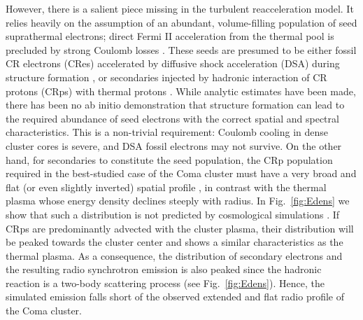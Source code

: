 \documentclass[a4paper,fleqn,usenatbib]{mnras}
\begin{document}
However, there is a salient piece missing in the turbulent
reacceleration model. It relies heavily on the assumption of an
abundant, volume-filling population of seed suprathermal electrons;
direct Fermi II acceleration from the thermal pool is precluded by
strong Coulomb losses
\citep{2008ApJ...682..175P,2012ApJ...759..113C}. These seeds are
presumed to be either fossil CR electrons (CRes) accelerated by
diffusive shock acceleration (DSA) during structure formation
\citep{1999ApJ...520..529S}, or secondaries injected by hadronic
interaction of CR protons (CRps) with thermal protons
\citep{brunetti11}. While analytic estimates have been made, there has
been no ab initio demonstration that structure formation can lead to
the required abundance of seed electrons with the correct spatial and
spectral characteristics. This is a non-trivial requirement: Coulomb
cooling in dense cluster cores is severe, and DSA fossil electrons may
not survive. On the other hand, for secondaries to constitute the seed
population, the CRp population required in the best-studied case of
the Coma cluster must have a very broad and flat (or even slightly
inverted) spatial profile \citep{brunetti12}, in contrast with the
thermal plasma whose energy density declines steeply with radius. In
Fig.~\ref{fig:Edens} we show that such a distribution is not predicted
by cosmological simulations \cite[see
  also][]{pinzke10,2014MNRAS.439.2662V}. If CRps are predominantly
advected with the cluster plasma, their distribution will be peaked
towards the cluster center and shows a similar characteristics as the
thermal plasma. As a consequence, the distribution of secondary
electrons and the resulting radio synchrotron emission is also peaked
since the hadronic reaction is a two-body scattering process (see
Fig.~\ref{fig:Edens}). Hence, the simulated emission falls short
of the observed extended and flat radio profile of the Coma cluster.
\end{document}
